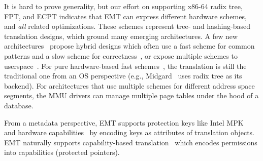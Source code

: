 \noindent
It is hard to prove generality, %
but our effort on supporting x86-64 radix tree, FPT, and ECPT
	indicates that EMT can express different hardware schemes, 
	and {\it all} related optimizations.
These schemes represent tree- and hashing-based translation designs, 
	which ground many emerging architectures.
%
A few new architectures~\cite{self:dmt,kanellopoulos2023utopia,alam2017doityourself,gupta2021midgard} 
	propose hybrid designs which often use a fast scheme for common patterns
	and a slow scheme for correctness~\cite{self:dmt,kanellopoulos2023utopia,gupta2021midgard},
	or expose multiple schemes to userspace~\cite{alam2017doityourself,engler1995avm}.
For pure hardware-based fast schemes~\cite{self:dmt,gupta2021midgard},
	the translation is still the traditional one from an OS perspective
	(e.g., Midgard~\cite{gupta2021midgard} uses radix tree as its backend).
For architectures that use multiple schemes for different address space segments,
	the MMU drivers can manage multiple page tables under the hood of a database.

From a metadata perspective,
EMT supports protection keys like Intel MPK~\cite{linux:pkey} %
	and hardware capabilities~\cite{cheri:paper}
	by encoding keys as attributes of translation objects.
EMT naturally supports capability-based translation~\cite{carter1994hardware,cheri:paper}
	which encodes permissions into capabilities (protected pointers).

